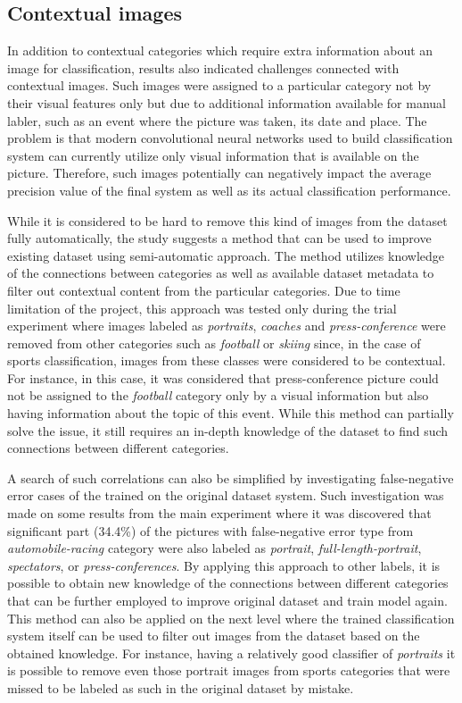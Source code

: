\subsection{Contextual images}
In addition to contextual categories which require extra information about an image for classification, results also indicated challenges connected with contextual images. Such images were assigned to a particular category not by their visual features only but due to additional information available for manual labler, such as an event where the picture was taken, its date and place. The problem is that modern convolutional neural networks used to build classification system can currently utilize only visual information that is available on the picture. Therefore, such images potentially can negatively impact the average precision value of the final system as well as its actual classification performance.

While it is considered to be hard to remove this kind of images from the dataset fully automatically, the study suggests a method that can be used to improve existing dataset using semi-automatic approach. The method utilizes knowledge of the connections between categories as well as available dataset metadata to filter out contextual content from the particular categories. Due to time limitation of the project, this approach was tested only during the trial experiment where images labeled as \textit{portraits}, \textit{coaches} and \textit{press-conference} were removed from other categories such as \textit{football} or \textit{skiing} since, in the case of sports classification, images from these classes were considered to be contextual. For instance, in this case, it was considered that press-conference picture could not be assigned to the \textit{football} category only by a visual information but also having information about the topic of this event. While this method can partially solve the issue, it still requires an in-depth knowledge of the dataset to find such connections between different categories.

A search of such correlations can also be simplified by investigating false-negative error cases of the trained on the original dataset system. Such investigation was made on some results from the main experiment where it was discovered that significant part (34.4\%) of the pictures with false-negative error type from \textit{automobile-racing} category were also labeled as \textit{portrait}, \textit{full-length-portrait}, \textit{spectators}, or \textit{press-conferences}. By applying this approach to other labels, it is possible to obtain new knowledge of the connections between different categories that can be further employed to improve original dataset and train model again. This method can also be applied on the next level where the trained classification system itself can be used to filter out images from the dataset based on the obtained knowledge. For instance, having a relatively good classifier of \textit{portraits} it is possible to remove even those portrait images from sports categories that were missed to be labeled as such in the original dataset by mistake.

